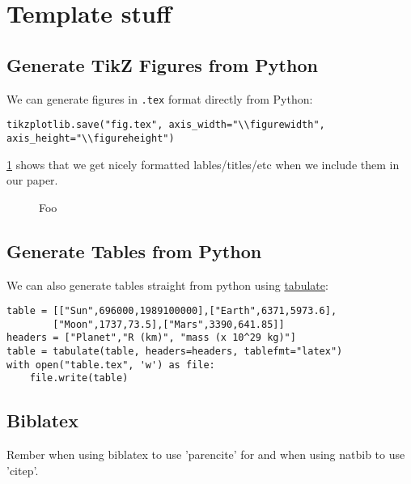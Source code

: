 \documentclass{article}
\newlength{\figurewidth}
\newlength{\figureheight}
\begin{document}
\section{Template stuff}
\subsection{Generate TikZ Figures from Python}
We can generate figures in \texttt{.tex} format directly from Python:
\begin{verbatim}
tikzplotlib.save("fig.tex", axis_width="\\figurewidth", axis_height="\\figureheight")
\end{verbatim}
\cref{fig:example} shows that we get nicely formatted lables/titles/etc when we include them in our paper.
\begin{figure}[h]
    \centering\footnotesize

    \setlength{\figurewidth}{.33\textwidth}
    \setlength{\figureheight}{.75\figurewidth}


    \begin{subfigure}{.4\textwidth}
        \centering
        
    \end{subfigure}
    \hfill
    \begin{subfigure}{.4\textwidth}
        \centering
        
    \end{subfigure}
    \caption{Foo}
    \label{fig:example}
\end{figure}

\subsection{Generate Tables from Python}
We can also generate tables straight from python using \href{https://github.com/astanin/python-tabulate}{tabulate}:
\begin{verbatim}
table = [["Sun",696000,1989100000],["Earth",6371,5973.6],
        ["Moon",1737,73.5],["Mars",3390,641.85]]
headers = ["Planet","R (km)", "mass (x 10^29 kg)"]
table = tabulate(table, headers=headers, tablefmt="latex")
with open("table.tex", 'w') as file:
    file.write(table)
\end{verbatim}

\begin{table}[h]
    \centering
    
\end{table}

\subsection{Biblatex}
Rember when using biblatex to use 'parencite' for \citep{kamtheDataEfficient2018} and when using natbib to use 'citep'.

%
\end{document}

